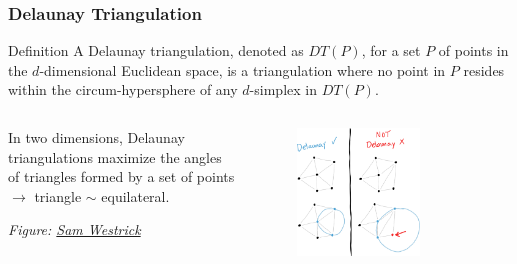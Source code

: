 \documentclass[10pt, aspectratio = 169]{beamer}
\begin{document}
\begin{frame}
    \frametitle{Delaunay Triangulation}
    \small
    \begin{block}{Definition}
        A Delaunay triangulation, denoted as $DT(P)$, for a set $P$ of points 
        in the $d$-dimensional Euclidean space, is a triangulation where no 
        point in $P$ resides within the circum-hypersphere of any $d$-simplex 
        in $DT(P)$.
        
    \end{block}
    \begin{columns}
        \begin{column}{0.6\textwidth}
        In  two dimensions, Delaunay triangulations maximize the angles of triangles 
        formed by a set of points $\rightarrow$ triangle $\sim$ equilateral.

         
        \emph{Figure: \href{https://shwestrick.github.io/2021/12/18/delaunay-viz.html}{Sam Westrick}}
        \end{column}
        \begin{column}{0.4\textwidth}
            \begin{figure}
                \includegraphics[width=0.7\textwidth]{figures/delaunay-not-delaunay.png}
                
            \end{figure}
        \end{column}
    \end{columns}
\end{frame}
\end{document}
